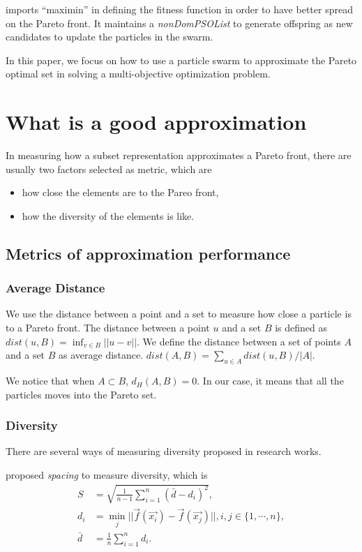 \documentclass[12pt]{article}
\begin{document}
\cite{li2004better} imports ``maximin'' in defining the fitness function in order to have better spread on the Pareto front.
It maintains a \emph{nonDomPSOList} to generate offspring as new candidates to update the particles in the swarm.


In this paper, we focus on how to use a particle swarm to approximate the Pareto optimal set in solving a multi-objective optimization problem.

\section{What is a good approximation}

In measuring how a subset representation approximates a Pareto front, there are usually two factors selected as metric, which are
\begin{itemize}
\item how close the elements are to the Pareo front,
\item how the diversity of the elements is like.
\end{itemize}

\subsection{Metrics of approximation performance}

\subsubsection{Average Distance}

We use the distance between a point and a set to measure how close a particle is to a Pareto front.
The distance between a point $ u $ and a set $ B $ is defined as 
$ dist(u, B) = \inf_{v \in B} || u - v ||  $.
We define the distance between a set of points $ A $ and a set $ B $ as average distance.
$ dist(A, B) = \sum_{ u \in A } dist(u, B) / | A | $.


We notice that when $ A \subset B $, $ d_{H}(A, B) = 0 $.
In our case, it means that all the particles moves into the Pareto set.


\subsubsection{Diversity}

There are several ways of measuring diversity proposed in research works. 

\cite{risco2008optimization} proposed \emph{spacing} to measure diversity, which is 
\begin{equation}
\begin{aligned}
S & = \sqrt{\frac{1}{n-1}\sum_{i=1}^{n}(\bar{d}-d_{i})^{2}}, \\
d_{i} & = \min_{j} || \vec{f}(\vec{x_{i}}) - \vec{f}(\vec{x_{j}}) ||, i,j \in \{ 1, \cdots , n \}, \\
\bar{d} & = \frac{1}{n} \sum_{i=1}^{n} d_{i}.
\end{aligned}
\end{equation}
\end{document}
